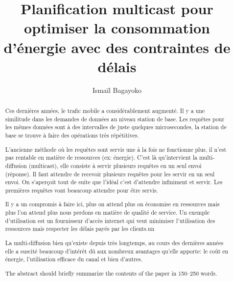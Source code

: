 \documentclass[runningheads]{llncs}
\begin{document}
%
\title{Planification multicast pour optimiser la consommation 
d'\'energie avec des contraintes de d\'elais}
%
%
\author{Isma\"il Bagayoko}
%
%
%
\maketitle              %
%
\begin{abstract}
Ces dernières années, le trafic mobile a considérablement augmenté. 
Il y a une similitude dans les demandes de données au niveau station 
de base. Les requêtes pour les mêmes données sont à des intervalles 
de juste quelques microsecondes, la station de base se trouve à faire des 
opérations très répétitives. 

L'ancienne méthode où les requêtes sont servis une à la fois ne 
fonctionne plus, il n'est pas rentable en matière de ressources 
(ex: énergie). C'est là qu'intervient la multi-diffusion (multicast), 
elle consiste à servir plusieurs requêtes en un seul envoi (réponse).
Il faut attendre de recevoir  plusieurs requêtes pour les servir en 
un seul envoi. On s'aperçoit tout de suite que l'idéal c'est d'attendre 
infiniment et servir. Les premières requêtes vont beaucoup attendre pour 
être servis.

Il y a un compromis à  faire ici, plus on attend plus on économise en 
ressources mais plus l'on attend plus nous perdons en matière de qualité 
de service. Un exemple d'utilisation est un fournisseur d'accès internet 
qui veut minimiser l'utilisation des ressources mais respecter les délais 
payés par les clients.un

La multi-diffusion bien qu'existe depuis très longtemps, au cours des 
dernières années elle a suscité beaucoup d'intérêt dû aux nombreux 
avantages qu'elle apporte: le coût en énergie, l'utilisation efficace 
du canal et bien d'autres.

The abstract should briefly summarize the contents of the paper in
150--250 words.

\end{abstract}
%
%
%
\end{document}
